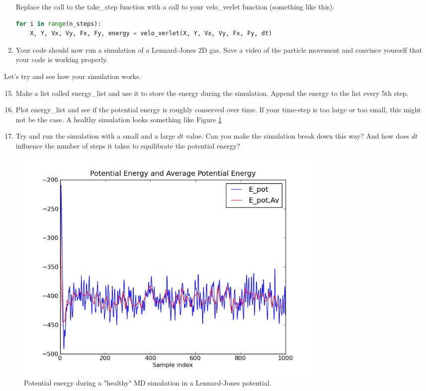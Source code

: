 \documentclass{article}
\begin{document}
\begin{enumerate}
    Replace the call to the take\_step function with a call to your
    velo\_verlet function (something like this):

\begin{lstlisting}[language=python]
for i in range(n_steps):
    X, Y, Vx, Vy, Fx, Fy, energy = velo_verlet(X, Y, Vx, Vy, Fx, Fy, dt)
\end{lstlisting}

    \item Your code should now run a simulation of a Lennard-Jones 2D gas.
        Save a video of the particle movement and convince yourself that your
        code is working properly.

\end{enumerate}

Let's try and see how your simulation works.

\begin{enumerate}
    \setcounter{enumi}{14}

    \item Make a list called energy\_list and use it to store the energy during
        the simulation. Append the energy to the list every 5th step.

    \item Plot energy\_list and see if the potential energy is roughly
        conserved over time.
        If your time-step is too large or too small, this
        might not be the case. A healthy simulation looks something like
        Figure \ref{fig:potential_energy}

    \item Try and run the simulation with a small and a large $dt$ value.
        Can you make the simulation break down this way? And how does $dt$
        influence the number of steps it takes to equilibrate the potential
        energy?

\end{enumerate}


\begin{figure}
\begin{center}
    \includegraphics[width=0.75\textwidth]{potential_energy.png}
    \caption{Potential energy during a "healthy" MD simulation in a Lennard-Jones potential.}
    \label{fig:potential_energy}
\end{center}
\end{figure}
\end{document}
